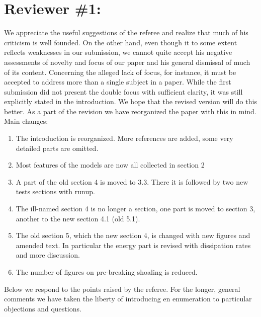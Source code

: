 \documentclass[11pt]{article}
\begin{document}
\newcommand{\refpoint}[1]{\ \vspace{0.3cm}\\ {\em #1}\  \vspace{0.3cm}\\ }
\newcommand{\refit}[1]{\em #1}
\newcommand{\todo}[1]{\ \\ {\bf To do: #1}\\}
\section*{Reviewer \#1:} 
We appreciate the useful suggestions of the referee and realize that much of his criticism is 
well founded. On the other hand, even though it to  some extent reflects weaknesses in our 
submission, we cannot quite accept his negative assessments of novelty and focus of our paper 
and his general dismissal of much of its content.  
Concerning the alleged lack of focus, for instance, it must be accepted to address more than 
a single subject in a paper. While the first submission did not present the double focus with sufficient clarity, it was
still explicitly stated in the introduction. We hope that the revised version will do this better.  As a part of the revision we have reorganized
the paper with this in mind. Main changes: 
\begin{enumerate}
\item The introduction is reorganized. More references are added, some very detailed parts are omitted.
\item Most features of the models are now all collected in section 2
\item A part of the old section 4 is moved to 3.3. There it is followed by two  new tests sections with runup.
\item The ill-named section 4 is no longer a section, one part is moved to section 3, another to the new section 4.1 (old 5.1). 
\item The old section 5, which the new section 4, is changed with new figures and amended text.
      In particular the energy part is revised with dissipation rates and more discussion.
\item The number of figures on pre-breaking shoaling is reduced. 
\end{enumerate}
Below we respond to the points raised by the referee. For the longer, general comments we have taken the liberty of
introducing en enumeration to particular objections and questions.
\end{document}
